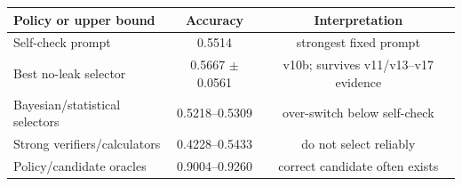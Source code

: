 \begin{tabular}{lcc}
\toprule
Policy or upper bound & Accuracy & Interpretation \\
\midrule
Self-check prompt & 0.5514 & strongest fixed prompt \\
Best no-leak selector & 0.5667 $\pm$ 0.0561 & v10b; survives v11/v13--v17 evidence \\
Bayesian/statistical selectors & 0.5218--0.5309 & over-switch below self-check \\
Strong verifiers/calculators & 0.4228--0.5433 & do not select reliably \\
\midrule
Policy/candidate oracles & 0.9004--0.9260 & correct candidate often exists \\
\bottomrule
\end{tabular}
